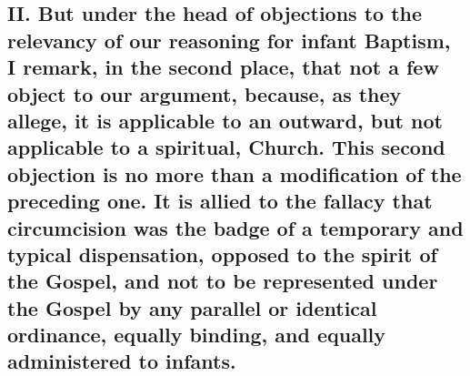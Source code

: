 \documentclass[]{book}
\begin{document}
\hypertarget{ii.-but-under-the-head-of-objections-to-the-relevancy-of-our-reasoning-for-infant-baptism-i-remark-in-the-second-place-that-not-a-few-object-to-our-argument-because-as-they-allege-it-is-applicable-to-an-outward-but-not-applicable-to-a-spiritual-church.-this-second-objection-is-no-more-than-a-modification-of-the-preceding-one.-it-is-allied-to-the-fallacy-that-circumcision-was-the-badge-of-a-temporary-and-typical-dispensation-opposed-to-the-spirit-of-the-gospel-and-not-to-be-represented-under-the-gospel-by-any-parallel-or-identical-ordinance-equally-binding-and-equally-administered-to-infants.}{%
\subsection{II. But under the head of objections to the relevancy of our reasoning for infant Baptism, I remark, in the second place, that not a few object to our argument, because, as they allege, it is applicable to an outward, but not applicable to a spiritual, Church. This second objection is no more than a modification of the preceding one. It is allied to the fallacy that circumcision was the badge of a temporary and typical dispensation, opposed to the spirit of the Gospel, and not to be represented under the Gospel by any parallel or identical ordinance, equally binding, and equally administered to infants.}\label{ii.-but-under-the-head-of-objections-to-the-relevancy-of-our-reasoning-for-infant-baptism-i-remark-in-the-second-place-that-not-a-few-object-to-our-argument-because-as-they-allege-it-is-applicable-to-an-outward-but-not-applicable-to-a-spiritual-church.-this-second-objection-is-no-more-than-a-modification-of-the-preceding-one.-it-is-allied-to-the-fallacy-that-circumcision-was-the-badge-of-a-temporary-and-typical-dispensation-opposed-to-the-spirit-of-the-gospel-and-not-to-be-represented-under-the-gospel-by-any-parallel-or-identical-ordinance-equally-binding-and-equally-administered-to-infants.}}
\end{document}
